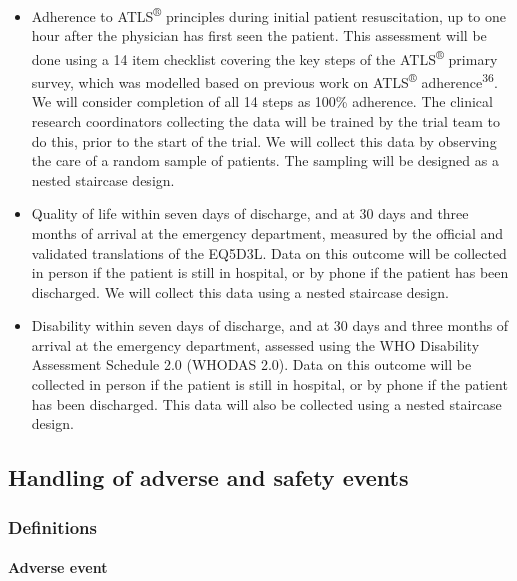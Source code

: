 \documentclass[
]{scrartcl}
\let\oldparagraph\paragraph
\renewcommand{\paragraph}[1]{\oldparagraph{#1}\mbox{}}
\providecommand{\tightlist}{%
  \setlength{\itemsep}{0pt}\setlength{\parskip}{0pt}}\usepackage{longtable,booktabs,array}
\begin{document}
\begin{itemize}
\tightlist
\item
  Adherence to ATLS\textsuperscript{®} principles during initial patient
  resuscitation, up to one hour after the physician has first seen the
  patient. This assessment will be done using a 14 item checklist
  covering the key steps of the ATLS\textsuperscript{®} primary survey,
  which was modelled based on previous work on ATLS\textsuperscript{®}
  adherence\textsuperscript{36}. We will consider completion of all 14
  steps as 100\% adherence. The clinical research coordinators
  collecting the data will be trained by the trial team to do this,
  prior to the start of the trial. We will collect this data by
  observing the care of a random sample of patients. The sampling will
  be designed as a nested staircase design.
\item
  Quality of life within seven days of discharge, and at 30 days and
  three months of arrival at the emergency department, measured by the
  official and validated translations of the EQ5D3L. Data on this
  outcome will be collected in person if the patient is still in
  hospital, or by phone if the patient has been discharged. We will
  collect this data using a nested staircase design.
\item
  Disability within seven days of discharge, and at 30 days and three
  months of arrival at the emergency department, assessed using the WHO
  Disability Assessment Schedule 2.0 (WHODAS 2.0). Data on this outcome
  will be collected in person if the patient is still in hospital, or by
  phone if the patient has been discharged. This data will also be
  collected using a nested staircase design.
\end{itemize}

\hypertarget{handling-of-adverse-and-safety-events}{%
\subsection{Handling of adverse and safety
events}\label{handling-of-adverse-and-safety-events}}

\hypertarget{definitions}{%
\subsubsection{Definitions}\label{definitions}}

\hypertarget{adverse-event}{%
\paragraph{Adverse event}\label{adverse-event}}
\end{document}
